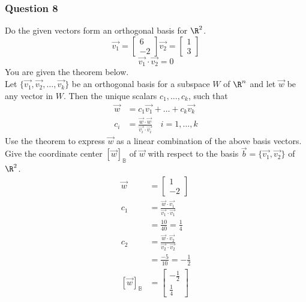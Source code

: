 \documentclass{math}
\begin{document}
\subsubsection*{Question 8}
Do the given vectors form an orthogonal basis for \( \R^2 \).
\[ \vec{v_1} = \begin{bmatrix}6 \\ -2\end{bmatrix}
  \vec{v_2} = \begin{bmatrix}1 \\ 3\end{bmatrix} \]
\[ \vec{v_1}\cdot\vec{v_2} = 0 \]
You are given the theorem below. \\
Let \( \{\vec{v_1},\vec{v_2},\dots,\vec{v_k}\} \) be an orthogonal basis for a
subspace \( W \) of \( \R^n \) and let \( \vec{w} \) be any vector in \( W \).
Then the unique scalars \( c_1,\dots,c_k \), such that
\begin{align*}
  \vec{w} &= c_1\vec{v_1}+\dots+c_k\vec{v_k} \\
  c_i &= \frac{\vec{w}\cdot\vec{w}}{\vec{v_i}\cdot\vec{v_i}} \quad
    i = 1,\dots,k
\end{align*}
Use the theorem to express \( \vec{w} \) as a linear combination of the above
basis vectors. Give the coordinate center \( [\vec{w}]_{\mathbb{B}} \) of
\( \vec{w} \) with respect to the basis \( \vec{b} = \{\vec{v_1},\vec{v_2}\} \)
of \( \R^2 \).
\begin{align*}
  \vec{w} &= \begin{bmatrix}1 \\ -2\end{bmatrix} \\
  c_1 &= \frac{\vec{w}\cdot\vec{v_1}}{\vec{v_1}\cdot\vec{v_1}} \\
  &= \frac{10}{40} = \frac{1}{4} \\
  c_2 &= \frac{\vec{w}\cdot\vec{v_2}}{\vec{v_2}\cdot\vec{v_2}} \\
  &= \frac{-5}{10} = -\frac{1}{2} \\
  [\vec{w}]_{\mathbb{B}} &=
    \begin{bmatrix}-\frac{1}{2} \\ \frac{1}{4}\end{bmatrix}
\end{align*}
\end{document}

